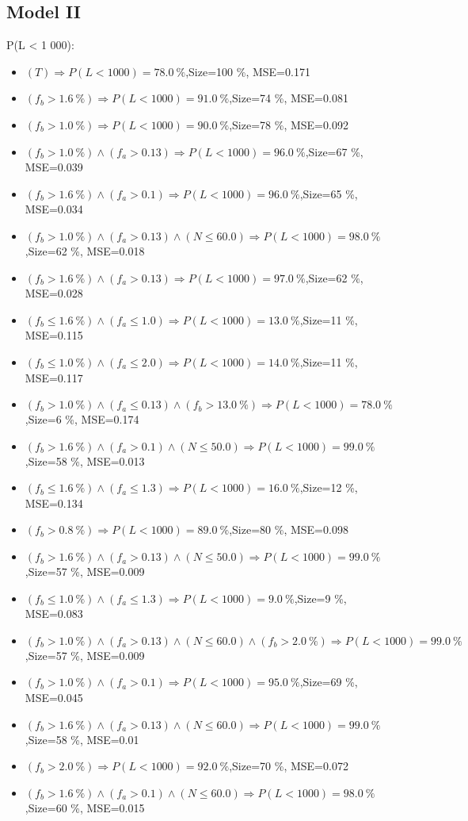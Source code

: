 \documentclass[numbered]{CSL}
\begin{document}
\subsection{Model II}
P(L < 1 000):
\begin{itemize}
\item $(T) \Rightarrow P(L < 1 000) = 78.0~\%$,\hfill Size=100 \%, MSE=0.171
\item $(f_b > 1.6~\%) \Rightarrow P(L < 1 000) = 91.0~\%$,\hfill Size=74 \%, MSE=0.081
\item $(f_b > 1.0~\%) \Rightarrow P(L < 1 000) = 90.0~\%$,\hfill Size=78 \%, MSE=0.092
\item $(f_b > 1.0~\%) \land (f_a > 0.13) \Rightarrow P(L < 1 000) = 96.0~\%$,\hfill Size=67 \%, MSE=0.039
\item $(f_b > 1.6~\%) \land (f_a > 0.1) \Rightarrow P(L < 1 000) = 96.0~\%$,\hfill Size=65 \%, MSE=0.034
\item $(f_b > 1.0~\%) \land (f_a > 0.13) \land (N \leq 60.0) \Rightarrow P(L < 1 000) = 98.0~\%$,\hfill Size=62 \%, MSE=0.018
\item $(f_b > 1.6~\%) \land (f_a > 0.13) \Rightarrow P(L < 1 000) = 97.0~\%$,\hfill Size=62 \%, MSE=0.028
\item $(f_b \leq 1.6~\%) \land (f_a \leq 1.0) \Rightarrow P(L < 1 000) = 13.0~\%$,\hfill Size=11 \%, MSE=0.115
\item $(f_b \leq 1.0~\%) \land (f_a \leq 2.0) \Rightarrow P(L < 1 000) = 14.0~\%$,\hfill Size=11 \%, MSE=0.117
\item $(f_b > 1.0~\%) \land (f_a \leq 0.13) \land (f_b > 13.0~\%) \Rightarrow P(L < 1 000) = 78.0~\%$,\hfill Size=6 \%, MSE=0.174
\item $(f_b > 1.6~\%) \land (f_a > 0.1) \land (N \leq 50.0) \Rightarrow P(L < 1 000) = 99.0~\%$,\hfill Size=58 \%, MSE=0.013
\item $(f_b \leq 1.6~\%) \land (f_a \leq 1.3) \Rightarrow P(L < 1 000) = 16.0~\%$,\hfill Size=12 \%, MSE=0.134
\item $(f_b > 0.8~\%) \Rightarrow P(L < 1 000) = 89.0~\%$,\hfill Size=80 \%, MSE=0.098
\item $(f_b > 1.6~\%) \land (f_a > 0.13) \land (N \leq 50.0) \Rightarrow P(L < 1 000) = 99.0~\%$,\hfill Size=57 \%, MSE=0.009
\item $(f_b \leq 1.0~\%) \land (f_a \leq 1.3) \Rightarrow P(L < 1 000) = 9.0~\%$,\hfill Size=9 \%, MSE=0.083
\item $(f_b > 1.0~\%) \land (f_a > 0.13) \land (N \leq 60.0) \land (f_b > 2.0~\%) \Rightarrow P(L < 1 000) = 99.0~\%$,\hfill Size=57 \%, MSE=0.009
\item $(f_b > 1.0~\%) \land (f_a > 0.1) \Rightarrow P(L < 1 000) = 95.0~\%$,\hfill Size=69 \%, MSE=0.045
\item $(f_b > 1.6~\%) \land (f_a > 0.13) \land (N \leq 60.0) \Rightarrow P(L < 1 000) = 99.0~\%$,\hfill Size=58 \%, MSE=0.01
\item $(f_b > 2.0~\%) \Rightarrow P(L < 1 000) = 92.0~\%$,\hfill Size=70 \%, MSE=0.072
\item $(f_b > 1.6~\%) \land (f_a > 0.1) \land (N \leq 60.0) \Rightarrow P(L < 1 000) = 98.0~\%$,\hfill Size=60 \%, MSE=0.015
\end{itemize}
\end{document}
